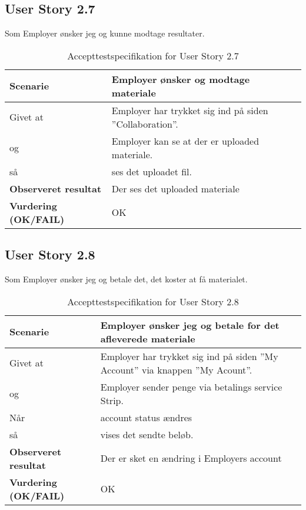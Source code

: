 \subsection{User Story 2.7}
Som Employer ønsker jeg og kunne modtage resultater.

\begin{table}[H]
	\centering
	\caption{Accepttestspecifikation for User Story 2.7}
	\begin{tabular}{p{6cm}|p{6cm}}
		\hline
		\textbf{Scenarie} & Employer ønsker og modtage materiale\\[10px]
		\hline
		Givet at & Employer har trykket sig ind på siden ''Collaboration''.\\
        \hline
        og & Employer kan se at der er uploaded materiale.\\
        \hline
        så & ses det uploadet fil.\\
		\hline
		\rowcolor{white}
		\textbf{Observeret resultat} & Der ses det uploaded materiale\\
		\hline
		\textbf{Vurdering (OK/FAIL)} & OK\\
		\hline
	\end{tabular}
\end{table}

\subsection{User Story 2.8}
Som Employer ønsker jeg og betale det, det koster at få materialet.


\begin{table}[H]
	\centering
	\caption{Accepttestspecifikation for User Story 2.8}
	\begin{tabular}{p{6cm}|p{6cm}}
		\hline
		\textbf{Scenarie} & Employer ønsker jeg og betale for det afleverede materiale\\[10px]
		\hline
		Givet at & Employer har trykket sig ind på siden ''My Account'' via knappen ''My Acount''.\\
        \hline
        og & Employer sender penge via betalings service Strip.\\
        \hline
        Når & account status ændres\\
        \hline
        så & vises det sendte beløb.\\
		\hline
		\rowcolor{white}
		\textbf{Observeret resultat} & Der er sket en ændring i Employers account\\
		\hline
		\textbf{Vurdering (OK/FAIL)} & OK\\
		\hline
	\end{tabular}
\end{table}